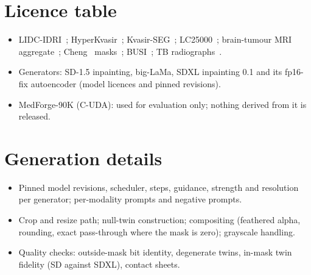 \section{Licence table}
\label{sec:supp:licence}
\begin{itemize}[leftmargin=*,itemsep=1pt]
\item LIDC-IDRI~\cite{armato2011lidc}; HyperKvasir~\cite{borgli2020hyperkvasir}; Kvasir-SEG~\cite{jha2020kvasirseg}; LC25000~\cite{borkowski2019lc25000}; brain-tumour MRI aggregate~\cite{nickparvar2021brainmri}; Cheng \etal\ masks~\cite{cheng2015brain}; BUSI~\cite{aldhabyani2020busi}; TB radiographs~\cite{rahman2020tb}.
\item Generators: SD-1.5 inpainting, big-LaMa, SDXL inpainting 0.1 and its fp16-fix autoencoder (model licences and pinned revisions).
\item MedForge-90K (C-UDA): used for evaluation only; nothing derived from it is released.
\end{itemize}

\section{Generation details}
\begin{itemize}[leftmargin=*,itemsep=1pt]
\item Pinned model revisions, scheduler, steps, guidance, strength and resolution per generator; per-modality prompts and negative prompts.
\item Crop and resize path; null-twin construction; compositing (feathered alpha, rounding, exact pass-through where the mask is zero); grayscale handling.
\item Quality checks: outside-mask bit identity, degenerate twins, in-mask twin fidelity (SD against SDXL), contact sheets.
\end{itemize}

